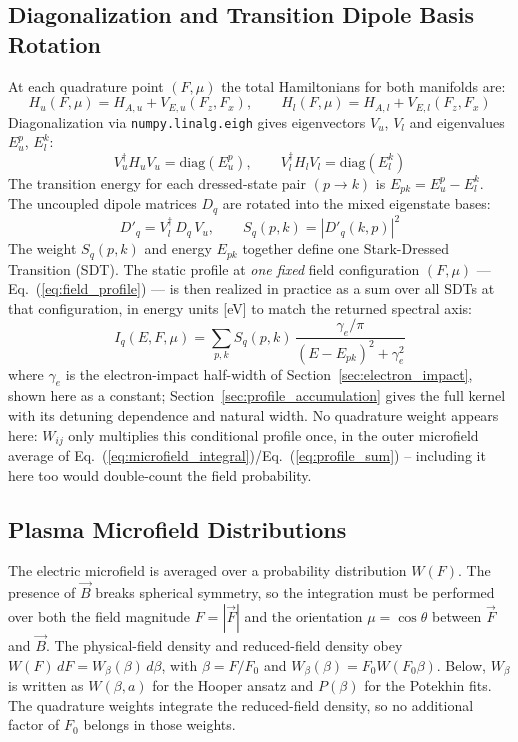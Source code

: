 \documentclass[11pt,a4paper]{article}
\numberwithin{equation}{section}
\begin{document}
\subsection{Diagonalization and Transition Dipole Basis Rotation}
\label{sec:diagonalization}
At each quadrature point $(F, \mu)$ the total Hamiltonians for both manifolds are:
\begin{equation}
H_u(F,\mu) = H_{A,u} + V_{E,u}(F_z, F_x),
\qquad
H_l(F,\mu) = H_{A,l} + V_{E,l}(F_z, F_x)
\end{equation}
Diagonalization via \texttt{numpy.linalg.eigh} gives eigenvectors $V_u$, $V_l$ and eigenvalues $E_u^p$, $E_l^k$:
\begin{equation}
V_u^\dagger H_u V_u = \mathrm{diag}(E_u^p),
\qquad
V_l^\dagger H_l V_l = \mathrm{diag}(E_l^k)
\end{equation}
The transition energy for each dressed-state pair $(p \to k)$ is $E_{pk} = E_u^p - E_l^k$.  The uncoupled dipole matrices $D_q$ are rotated into the mixed eigenstate bases:
\begin{equation}
D'_q = V_l^\dagger\,D_q\,V_u,
\qquad
S_q(p,k) = |D'_q(k,p)|^2
\end{equation}
The weight $S_q(p,k)$ and energy $E_{pk}$ together define one Stark-Dressed Transition (SDT). The static profile at \emph{one fixed} field configuration $(F,\mu)$ — Eq.~(\ref{eq:field_profile}) — is then realized in practice as a sum over all SDTs at that configuration, in energy units [eV] to match the returned spectral axis:
\begin{equation}
I_q(E,F,\mu) = \sum_{p,k} S_q(p,k)\,\frac{\gamma_e/\pi}{(E - E_{pk})^2 + \gamma_e^2}
\end{equation}
where $\gamma_e$ is the electron-impact half-width of Section~\ref{sec:electron_impact}, shown here as a constant; Section~\ref{sec:profile_accumulation} gives the full kernel with its detuning dependence and natural width. No quadrature weight appears here: $W_{ij}$ only multiplies this conditional profile once, in the outer microfield average of Eq.~(\ref{eq:microfield_integral})/Eq.~(\ref{eq:profile_sum}) -- including it here too would double-count the field probability.

\subsection{Plasma Microfield Distributions}
\label{sec:microfield}
The electric microfield is averaged over a probability distribution $W(F)$. The presence of $\vec{B}$ breaks spherical symmetry, so the integration must be performed over both the field magnitude $F = |\vec{F}|$ and the orientation $\mu = \cos\theta$ between $\vec{F}$ and $\vec{B}$.
The physical-field density and reduced-field density obey
$W(F)\,dF=W_\beta(\beta)\,d\beta$, with $\beta=F/F_0$ and
$W_\beta(\beta)=F_0W(F_0\beta)$. Below, $W_\beta$ is written as
$W(\beta,a)$ for the Hooper ansatz and $P(\beta)$ for the Potekhin fits.
The quadrature weights integrate the reduced-field density, so no additional
factor of $F_0$ belongs in those weights.
\end{document}

